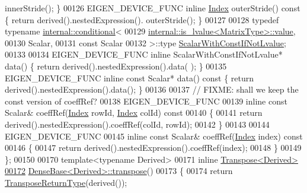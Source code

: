 \begin{DoxyCode}
      innerStride(); \}
00126     EIGEN\_DEVICE\_FUNC \textcolor{keyword}{inline} \hyperlink{namespace_eigen_a62e77e0933482dafde8fe197d9a2cfde}{Index} outerStride()\textcolor{keyword}{ const }\{ \textcolor{keywordflow}{return} derived().nestedExpression().
      outerStride(); \}
00127 
00128     \textcolor{keyword}{typedef} \textcolor{keyword}{typename} \hyperlink{struct_eigen_1_1internal_1_1conditional}{internal::conditional}<
00129                        \hyperlink{struct_eigen_1_1internal_1_1is__lvalue}{internal::is\_lvalue<MatrixType>::value},
00130                        Scalar,
00131                        \textcolor{keyword}{const} Scalar
00132                      >::type \hyperlink{class_eigen_1_1internal_1_1_tensor_lazy_evaluator_writable}{ScalarWithConstIfNotLvalue};
00133 
00134     EIGEN\_DEVICE\_FUNC \textcolor{keyword}{inline} ScalarWithConstIfNotLvalue* data() \{ \textcolor{keywordflow}{return} derived().nestedExpression().data(
      ); \}
00135     EIGEN\_DEVICE\_FUNC \textcolor{keyword}{inline} \textcolor{keyword}{const} Scalar* data()\textcolor{keyword}{ const }\{ \textcolor{keywordflow}{return} derived().nestedExpression().data(); \}
00136 
00137     \textcolor{comment}{// FIXME: shall we keep the const version of coeffRef?}
00138     EIGEN\_DEVICE\_FUNC
00139     \textcolor{keyword}{inline} \textcolor{keyword}{const} Scalar& coeffRef(\hyperlink{namespace_eigen_a62e77e0933482dafde8fe197d9a2cfde}{Index} rowId, \hyperlink{namespace_eigen_a62e77e0933482dafde8fe197d9a2cfde}{Index} colId)\textcolor{keyword}{ const}
00140 \textcolor{keyword}{    }\{
00141       \textcolor{keywordflow}{return} derived().nestedExpression().coeffRef(colId, rowId);
00142     \}
00143 
00144     EIGEN\_DEVICE\_FUNC
00145     \textcolor{keyword}{inline} \textcolor{keyword}{const} Scalar& coeffRef(\hyperlink{namespace_eigen_a62e77e0933482dafde8fe197d9a2cfde}{Index} index)\textcolor{keyword}{ const}
00146 \textcolor{keyword}{    }\{
00147       \textcolor{keywordflow}{return} derived().nestedExpression().coeffRef(index);
00148     \}
00149 \};
00150 
00170 \textcolor{keyword}{template}<\textcolor{keyword}{typename} Derived>
00171 \textcolor{keyword}{inline} \hyperlink{group___core___module_class_eigen_1_1_transpose}{Transpose<Derived>}
\hyperlink{group___core___module_ac8952c19644a4ac7e41bea45c19b909c}{00172} \hyperlink{group___core___module_ac8952c19644a4ac7e41bea45c19b909c}{DenseBase<Derived>::transpose}()
00173 \{
00174   \textcolor{keywordflow}{return} \hyperlink{group___core___module_class_eigen_1_1_transpose}{TransposeReturnType}(derived());

\end{DoxyCode}
